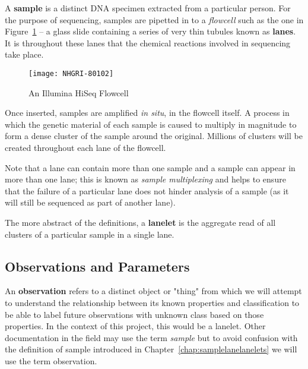 A \textbf{sample} is a distinct DNA specimen extracted from a particular person.
For the purpose of sequencing, samples are pipetted in to a \textit{flowcell}
such as the one in Figure~\ref{fig:flowcell} -- a glass slide
containing a series of very thin tubules known as \textbf{lanes}.  It is
throughout these lanes that the chemical reactions involved in sequencing take place.

\begin{figure}[htbp!]
    \centering
    \texttt{[image: NHGRI-80102]}
    \caption[flowcell]{An Illumina HiSeq Flowcell\citep{img:flowcell}}
    \label{fig:flowcell}
\end{figure}

Once inserted, samples are amplified \textit{in situ}, in the flowcell itself. A
process in which the genetic material of each sample is caused to multiply in
magnitude to form a dense cluster of the sample around the original. Millions of
clusters will be created throughout each lane of the flowcell.

Note that a lane can contain more than one sample and a sample can appear in
more than one lane; this is known as \textit{sample multiplexing} and helps to
ensure that the failure of a particular lane does not hinder analysis of a
sample (as it will still be sequenced as part of another lane).

The more abstract of the definitions, a \textbf{lanelet} is the aggregate read
of all clusters of a particular sample in a single lane.




\subsection{Observations and Parameters}

An \textbf{observation} refers to a distinct object or "thing" from which we
will attempt to understand the relationship between its known properties and
classification to be able to label future observations with unknown class based
on those properties. In the context of this project, this would be a lanelet.
Other documentation in the field may use the term \textit{sample} but to avoid
confusion with the definition of sample introduced in
Chapter~\ref{chap:samplelanelanelets} we will use the term observation.

